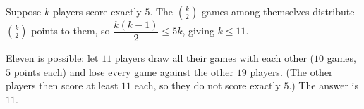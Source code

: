 Suppose $k$ players score exactly $5$. The $\binom k2$ games among themselves distribute $\binom k2$ points to them, so $\dfrac{k(k-1)}2\le5k$, giving $k\le11$.

Eleven is possible: let $11$ players draw all their games with each other ($10$ games, $5$ points each) and lose every game against the other $19$ players. (The other players then score at least $11$ each, so they do not score exactly $5$.) The answer is $\boxed{11}$.
